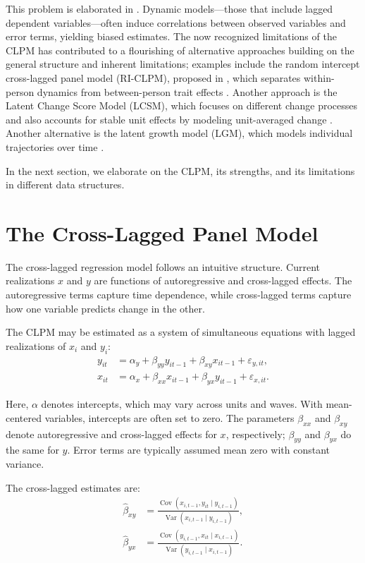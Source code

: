 \documentclass[12pt]{article}
\begin{document}
This problem is elaborated in \cite{hsiao2022}. Dynamic models---those that include lagged dependent variables---often induce correlations between observed variables and error terms, yielding biased estimates. The now recognized limitations of the CLPM has contributed to a flourishing of alternative approaches building on the general structure and inherent limitations; examples include the  random intercept cross-lagged panel model (RI-CLPM), proposed in \cite{Hamaker2015}, which separates within-person dynamics from between-person trait effects \cite{Usami2019,Ldtke2022}. Another approach is the Latent Change Score Model (LCSM), which focuses on different change processes and also accounts for stable unit effects by modeling unit-averaged change \cite{Usami2015,McArdle2009,Kim2021}. Another alternative is the latent growth model (LGM), which models individual trajectories over time \cite{usami2015,mcardle2003}.

In the next section, we elaborate on the CLPM, its strengths, and its limitations in different data structures.

\section*{The Cross-Lagged Panel Model}

The cross-lagged regression model follows an intuitive structure. Current realizations $x$ and $y$ are functions of autoregressive and cross-lagged effects. The autoregressive terms capture time dependence, while cross-lagged terms capture how one variable predicts change in the other.

The CLPM may be estimated as a system of simultaneous equations with lagged realizations of $x_i$ and $y_i$:
\begin{align}
  y_{it} &= \alpha_{y} + \beta_{yy}y_{it-1} + \beta_{xy}x_{it-1} + \varepsilon_{y,it},\\
  x_{it} &= \alpha_{x} + \beta_{xx}x_{it-1} + \beta_{yx}y_{it-1} + \varepsilon_{x,it}.
\end{align}

Here, $\alpha$ denotes intercepts, which may vary across units and waves. With mean-centered variables, intercepts are often set to zero. The parameters $\beta_{xx}$ and $\beta_{xy}$ denote autoregressive and cross-lagged effects for $x$, respectively; $\beta_{yy}$ and $\beta_{yx}$ do the same for $y$. Error terms are typically assumed mean zero with constant variance.

The cross-lagged estimates are:
\begin{align}
\hat{\beta}_{xy}
&=
\frac{\operatorname{Cov}(x_{i,t-1},y_{it}\mid y_{i,t-1})}
{\operatorname{Var}(x_{i,t-1}\mid y_{i,t-1})}, \\
\hat{\beta}_{yx}
&=
\frac{\operatorname{Cov}(y_{i,t-1},x_{it}\mid x_{i,t-1})}
{\operatorname{Var}(y_{i,t-1}\mid x_{i,t-1})}.
\end{align}
\end{document}
